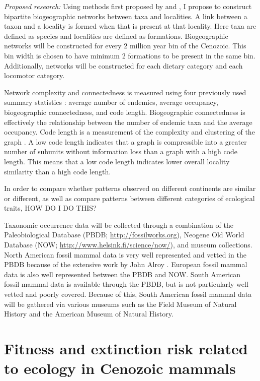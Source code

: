 \documentclass[12pt,letterpaper]{article}
\begin{document}
\textit{Proposed research:}
Using methods first proposed by \citet{Sidor2013} and \citet{Vilhena2013}, I propose to construct bipartite biogeographic networks between taxa and localities. A link between a taxon and a locality is formed when that is present at that locality. Here taxa are defined as species and localities are defined as formations. Biogeographic networks will be constructed for every 2 million year bin of the Cenozoic. This bin width is chosen to have minimum 2 formations to be present in the same bin. Additionally, networks will be constructed for each dietary category and each locomotor category. 

Network complexity and connectedness is measured using four previously used summary statistics \citep{Sidor2013}: average number of endemics, average occupancy, biogeographic connectedness, and code length. Biogeographic connectedness is effectively the relationship between the number of endemic taxa and the average occupancy. Code length is a measurement of the complexity and clustering of the graph \citep{Rosvall2008,Rosvall2010b}. A low code length indicates that a graph is compressible into a greater number of subunits without information loss than a graph with a high code length. This means that a low code length indicates lower overall locality similarity than a high code length.

In order to compare whether patterns observed on different continents are similar or different, as well as compare patterns between different categories of ecological traits, HOW DO I DO THIS?

Taxonomic occurrence data will be collected through a combination of the Paleobiological Database (PBDB; \url{http://fossilworks.org}), Neogene Old World Database (NOW; \url{http://www.helsink.fi/science/now/}), and museum collections. North American fossil mammal data is very well represented and vetted in the PBDB because of the extensive work by John Alroy \citep{Alroy1996a,Alroy1998,Alroy2000g}. European fossil mammal data is also well represented between the PBDB and NOW. South American fossil mammal data is available through the PBDB, but is not particularly well vetted and poorly covered. Because of this, South American fossil mammal data will be gathered via various museums such as the Field Museum of Natural History and the American Museum of Natural History. 


\section{Fitness and extinction risk related to ecology in Cenozoic mammals}
\end{document}
